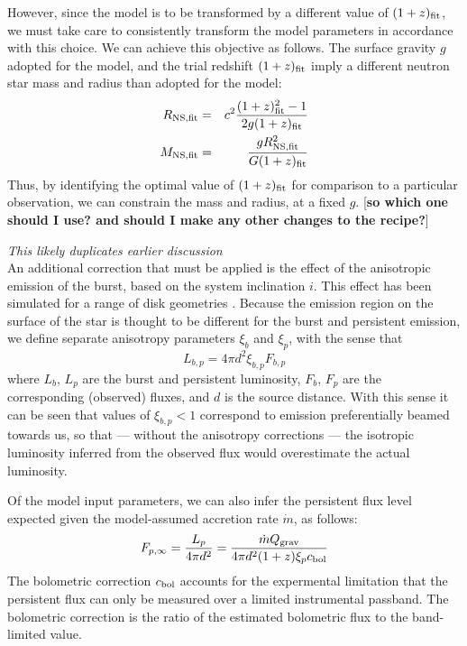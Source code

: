 \documentclass{aastex61}
\begin{document}
However, since the model is to be transformed by a different value of $(1+z)_{\rm fit}$, we must take care to consistently transform the model parameters in accordance with this choice.
%
We can achieve this objective as follows. The surface gravity $g$ adopted for the model, and the trial redshift $(1+z)_{\rm fit}$ imply a different neutron star mass and radius than adopted for the model: 
%
\begin{eqnarray}
R_{\rm NS,fit} &=& c^2\frac{(1+z)_{\rm fit}^2-1}{2g(1+z)_{\rm fit}}\\
M_{\rm NS,fit} &=& \frac{gR_{\rm NS,fit}^2}{G(1+z)_{\rm fit}}
\end{eqnarray}
Thus, by identifying the optimal value of $(1+z)_{\rm fit}$ for comparison to a particular observation, we can constrain the mass and radius, at a fixed $g$. [{\bf so which one should I use? and should I make any other changes to the recipe?}]

{\it This likely duplicates earlier discussion} \\
%
An additional correction that must be applied is the effect of the anisotropic emission of the burst, based on the system inclination $i$. This effect has been simulated for a range of disk geometries \cite[e.g.][]{he16}. Because the emission region on the surface of the star is thought to be different for the burst and persistent emission, we define separate anisotropy parameters $\xi_b$ and $\xi_p$, with the sense that
\begin{equation}
L_{b,p} = 4\pi d^2\xi_{b,p}F_{b,p}
\end{equation}
where $L_b$, $L_p$ are the burst and persistent luminosity, $F_b$, $F_p$ are the corresponding (observed) fluxes, and $d$ is the source distance. With this sense it can be seen that values of $\xi_{b,p}<1$ correspond to emission preferentially beamed towards us, so that --- without the anisotropy corrections --- the isotropic luminosity inferred from the observed flux would overestimate the actual luminosity.

Of the model input parameters, we can also infer the persistent flux level expected given the model-assumed accretion rate $\dot{m}$, as follows: %
\begin{equation}
F_{p,\infty} = \frac{L_p}{4\pi d^2} = 
\frac{\dot{m} Q_{\rm grav}}{4\pi d^2 (1+z)\xi_p c_{\rm bol}}
\end{equation}
%
The bolometric correction $c_{\rm bol}$ accounts for the expermental limitation that the persistent flux can only be measured over a limited instrumental passband. The bolometric correction is the ratio of the estimated bolometric flux to the band-limited value.
\end{document}
